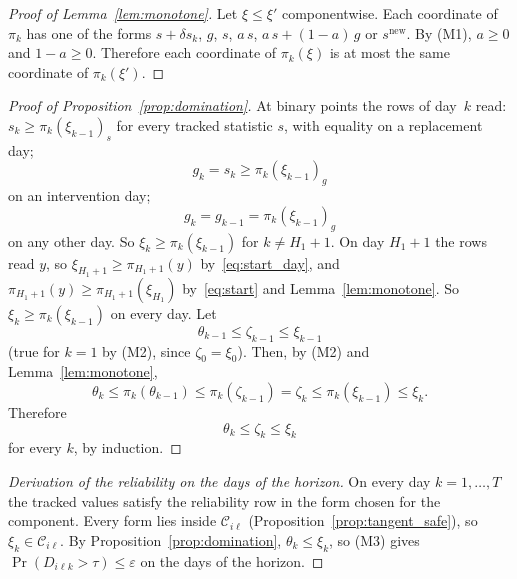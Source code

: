 \documentclass[11pt,a4paper]{article}
\theoremstyle{plain}
\theoremstyle{definition}
\theoremstyle{remark}
\begin{document}
\label{prf:lem:monotone}
\begin{proof}[Proof of Lemma~\ref{lem:monotone}]
Let $\xi \le \xi'$ componentwise.
Each coordinate of $\pi_k$ has one of the forms $s + \delta s_k$, $g$, $s$, $a\,s$, $a\,s + (1-a)\,g$ or $s^{\mathrm{new}}$.
By (M1), $a \ge 0$ and $1 - a \ge 0$.
Therefore each coordinate of $\pi_k(\xi)$ is at most the same coordinate of $\pi_k(\xi')$.
\end{proof}

\label{prf:prop:domination}
\begin{proof}[Proof of Proposition~\ref{prop:domination}]
At binary points the rows of day~$k$ read: $s_k \ge \pi_k(\xi_{k-1})_s$ for every tracked statistic $s$, with equality on a replacement day;
\begin{equation}
  g_k = s_k \ge \pi_k(\xi_{k-1})_g
\end{equation}
on an intervention day;
\begin{equation}
  g_k = g_{k-1} = \pi_k(\xi_{k-1})_g
\end{equation}
on any other day.
So $\xi_k \ge \pi_k(\xi_{k-1})$ for $k \ne H_1 + 1$.
On day $H_1 + 1$ the rows read $y$, so $\xi_{H_1+1} \ge \pi_{H_1+1}(y)$ by~\eqref{eq:start_day}, and $\pi_{H_1+1}(y) \ge \pi_{H_1+1}(\xi_{H_1})$ by~\eqref{eq:start} and Lemma~\ref{lem:monotone}.
So $\xi_k \ge \pi_k(\xi_{k-1})$ on every day.
Let
\begin{equation}
  \theta_{k-1} \le \zeta_{k-1} \le \xi_{k-1}
\end{equation}
(true for $k = 1$ by (M2), since $\zeta_0 = \xi_0$).
Then, by (M2) and Lemma~\ref{lem:monotone},
\begin{equation}
  \theta_k \le \pi_k(\theta_{k-1}) \le \pi_k(\zeta_{k-1}) = \zeta_k \le \pi_k(\xi_{k-1}) \le \xi_k .
\end{equation}
Therefore
\begin{equation}
  \theta_k \le \zeta_k \le \xi_k
\end{equation}
for every $k$, by induction.
\end{proof}

\label{drv:horizon_safety}
\begin{proof}[Derivation of the reliability on the days of the horizon]
On every day $k = 1, \ldots, T$ the tracked values satisfy the reliability row in the form chosen for the component.
Every form lies inside $\mathcal{C}_{i\ell}$ (Proposition~\ref{prop:tangent_safe}), so $\xi_k \in \mathcal{C}_{i\ell}$.
By Proposition~\ref{prop:domination}, $\theta_k \le \xi_k$, so (M3) gives $\Pr(D_{i\ell k} > \tau) \le \varepsilon$ on the days of the horizon.
\end{proof}
\end{document}
